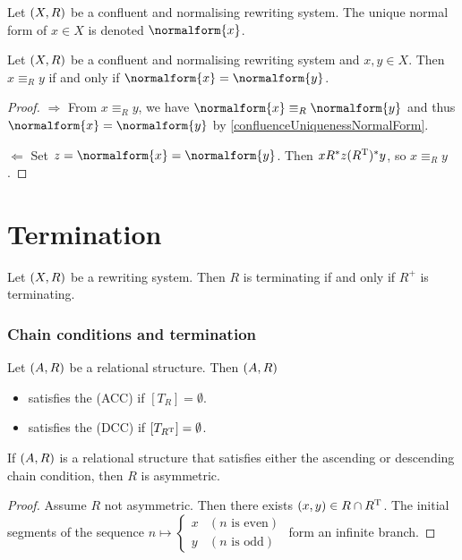 \begin{definition}
Let $\left( X,R \right)$ be a confluent and normalising rewriting system. The unique normal form of $x\in X$ is denoted $\normalform{x}$.
\end{definition}

\begin{proposition}
Let $\left( X,R \right)$ be a confluent and normalising rewriting system and $x,y\in X$. Then $x \equiv_R y$ \textup{if and only if} $\normalform{x} = \normalform{y}$.
\end{proposition}
\begin{proof}
$\boxed{\Rightarrow}$ From $x \equiv_R y$, we have $\normalform{x} \equiv_R \normalform{y}$ and thus $\normalform{x} = \normalform{y}$ by \ref{confluenceUniquenessNormalForm}.

$\boxed{\Leftarrow}$ Set $z = \normalform{x} = \normalform{y}$. Then $x R^* z (R^{\mathrm{T}})^* y$, so $x \equiv_R y$.
\end{proof}

\section{Termination}

\begin{lemma}
Let $\left( X,R \right)$ be a rewriting system. Then $R$ is terminating \textup{if and only if} $R^+$ is terminating.
\end{lemma}

\subsubsection{Chain conditions and termination}
\begin{definition}
Let $\left( A, R \right)$ be a relational structure. Then $\left( A, R \right)$
\begin{itemize}
\item satisfies the  (ACC) if $[T_R] = \emptyset$.
\item satisfies the  (DCC) if $[T_{R^{\mathrm{T}}}] = \emptyset$.
\end{itemize}
\end{definition}

\begin{lemma}
If $\left( A, R \right)$ is a relational structure that satisfies either the ascending or descending chain condition, then $R$ is asymmetric.
\end{lemma}
\begin{proof}
Assume $R$ not asymmetric. Then there exists $(x,y)\in R\cap R^{\mathrm{T}}$. The initial segments of the sequence $n\mapsto \begin{cases}
x & (\text{$n$ is even}) \\
y & (\text{$n$ is odd})
\end{cases}$ form an infinite branch.
\end{proof}

